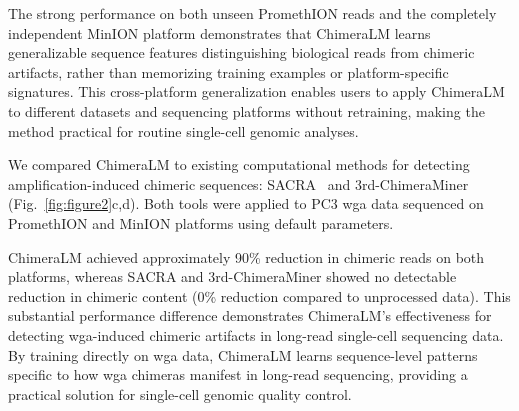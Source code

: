 \documentclass[pdflatex,sn-nature,lineno]{sn-jnl}%
\theoremstyle{thmstyleone}%
\theoremstyle{thmstyletwo}%
\theoremstyle{thmstylethree}%
\begin{document}
The strong performance on both unseen PromethION reads and the completely independent MinION platform demonstrates that ChimeraLM learns generalizable sequence features distinguishing biological reads from chimeric artifacts, rather than memorizing training examples or platform-specific signatures.
This cross-platform generalization enables users to apply ChimeraLM to different datasets and sequencing platforms without retraining, making the method practical for routine single-cell genomic analyses.

We compared ChimeraLM to existing computational methods for detecting amplification-induced chimeric sequences: SACRA~\cite{kiguchi2021longread} and 3rd-ChimeraMiner~\cite{lu2023exploration} (Fig.~\ref{fig:figure2}c,d).
Both tools were applied to PC3 \gls{wga} data sequenced on PromethION and MinION platforms using default parameters.

ChimeraLM achieved approximately 90\% reduction in chimeric reads on both platforms, whereas SACRA and 3rd-ChimeraMiner showed no detectable reduction in chimeric content (0\% reduction compared to unprocessed data).
This substantial performance difference demonstrates ChimeraLM's effectiveness for detecting \gls{wga}-induced chimeric artifacts in long-read single-cell sequencing data.
By training directly on \gls{wga} data, ChimeraLM learns sequence-level patterns specific to how \gls{wga} chimeras manifest in long-read sequencing, providing a practical solution for single-cell genomic quality control.
\end{document}
